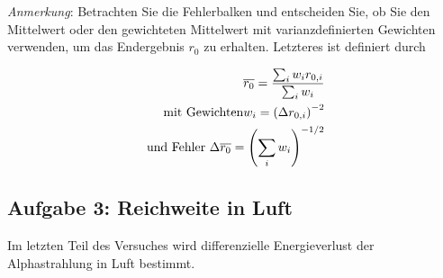 \begin{enumerate}[label=\textbf{\alph*)}]
    \textit{Anmerkung}: Betrachten Sie die Fehlerbalken und entscheiden Sie, ob Sie den Mittelwert oder den gewichteten Mittelwert mit varianzdefinierten Gewichten verwenden, um das Endergebnis $r_0$ zu erhalten. Letzteres ist definiert durch 

    \begin{subequations}\label{eq:weightmean}
    \begin{align}
		\overline{r_0} = \frac{\sum_i w_i r_{0,i}}{\sum_i w_i} \\
        \textnormal{mit Gewichten} w_i = \left( \Delta r_{0,i} \right)^{-2} \\\
        \textnormal{und Fehler } \Delta \overline{r_0} = \left( \sum_i w_i \right)^{-1/2}
    \end{align}
    \end{subequations}
\end{enumerate}

\subsection{Aufgabe 3: Reichweite in Luft}
Im letzten Teil des Versuches wird differenzielle Energieverlust der Alphastrahlung in Luft bestimmt.

